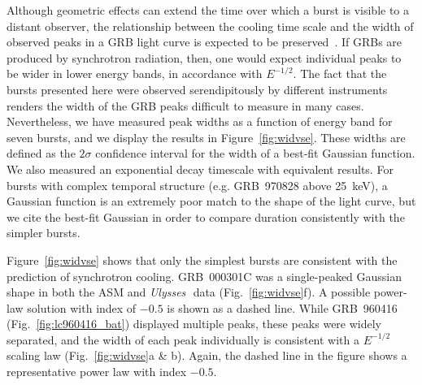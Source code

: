 \documentclass{aastex}
\def\uly{{\it Ulysses\,}}
\begin{document}
\begin{multicols}{2}
Although geometric effects can extend the time over which a burst is
visible to a distant observer, the relationship between the cooling
time scale and the width of observed peaks in a GRB light curve is
expected to be preserved~\citep{piran99}.  If GRBs are produced by
synchrotron radiation, then, one would expect individual peaks to be
wider in lower energy bands, in accordance with $E^{-1/2}$.  The fact
that the bursts presented here were observed serendipitously by
different instruments renders the width of the GRB peaks difficult to
measure in many cases.  Nevertheless, we have measured peak widths as
a function of energy band for seven bursts, and we display the results
in Figure~\ref{fig:widvse}.  These widths are defined as the $2\sigma$
confidence interval for the width of a best-fit Gaussian function.  We
also measured an exponential decay timescale with equivalent results.
For bursts with complex temporal structure (e.g. GRB~970828 above
25~keV), a Gaussian function is an extremely poor match to the shape
of the light curve, but we cite the best-fit Gaussian in order to
compare duration consistently with the simpler bursts.

Figure~\ref{fig:widvse} shows that only the simplest bursts are
consistent with the prediction of synchrotron cooling.  GRB~000301C
was a single-peaked Gaussian shape in both the ASM and \uly~data
(Fig.~\ref{fig:widvse}f).  A possible power-law solution with index of
$-0.5$ is shown as a dashed line.  While GRB~960416
(Fig.~\ref{fig:lc960416_bat}) displayed multiple peaks, these peaks
were widely separated, and the width of each peak individually is
consistent with a $E^{-1/2}$ scaling law (Fig.~\ref{fig:widvse}a \&
b).  Again, the dashed line in the figure shows a representative power
law with index $-0.5$.


\end{multicols}
\end{document}
